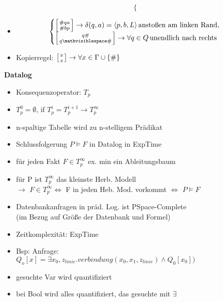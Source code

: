 \documentclass[12pt,a4paper]{article}
\begin{document}
\begin{paracol}{3}
\begin{itemize}
$$\begin{cases}
\end{cases}
$$
\item $$
\begin{cases}
\left[ {\# qa \atop \# bp} \right] \rightarrow \delta(q, a) = \langle p, b, L \rangle \, \text{anstoßen am linken Rand},\\
\left[ {q \# \atop q \mathvisiblespace \# } \right] \rightarrow \forall q \in Q \, \text{unendlich nach rechts}\\
\end{cases}
$$
\item Kopierregel:
$\left[ {x \atop x} \right] \rightarrow \forall x \in \Gamma \cup \{ \# \}$
\end{itemize}
\switchcolumn[2]
\centering
\textbf{Datalog}
\flushleft
\begin{itemize}
\setlength\itemsep{-0.5em}
\item Konsequenzoperator: $T_p$
\item $T_p^0 = \emptyset$, if $T_p^i = T_p^{i+1} \rightarrow T_p^\infty$
\item n-spaltige Tabelle wird zu n-stelligem Prädikat
\item Schlussfolgerung $P\models F$ in Datalog in ExpTime
\item für jeden Fakt $F\in T_p^\infty$ ex. min ein Ableitungsbaum
\item für P ist $T_p^\infty$ das kleinste Herb. Modell\\$\rightarrow$ $F\in T_p^\infty \Leftrightarrow$ F in jeden Heb. Mod. vorkommt $\Leftrightarrow$ $P\models F$
\item Datenbankanfragen in präd. Log. ist PSpace-Complete\\(im Bezug auf Größe der Datenbank und Formel)
\item Zeitkomplexität: ExpTime
\item Bsp: Anfrage:\\$Q_o[x] = \exists x_0,z_{linie}.verbindung(x_0, x_1, z_{linie}) \land Q_0[x_0])$
\item gesuchte Var wird quantifiziert
\item bei Bool wird alles quantifiziert, das gesuchte mit $\exists$
\end{itemize}
\end{paracol}
\end{document}
